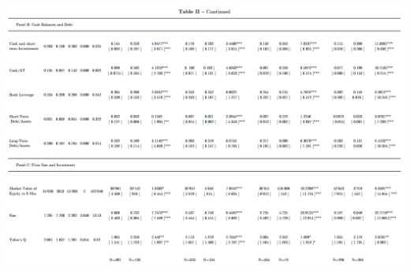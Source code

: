 \documentclass[12pt]{article}
\begin{document}
\begin{table}
	\centering
	\begin{adjustbox}{width=\textwidth}
		\includegraphics{Summary}
	\end{adjustbox}
\end{table}
\end{document}
